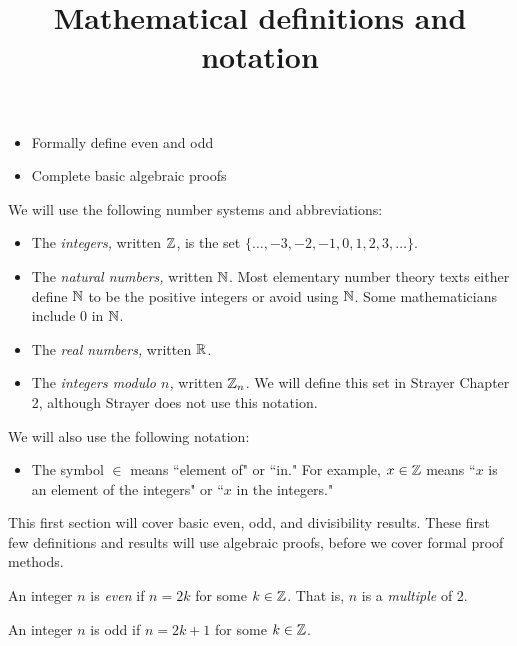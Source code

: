 \documentclass{ximera}
\title{Mathematical definitions and notation}
\begin{document}
\begin{abstract}
\end{abstract}
\maketitle


\begin{itemize}
  \item Formally define even and odd
  \item Complete basic algebraic proofs
\end{itemize}



\begin{definition}\label{defn:number-systems} 
  We will use the following number systems and abbreviations:
  \begin{itemize}
    \item The \emph{integers,} written $\mathbb Z$, is the set $\{\dots,-3,-2,-1,0,1,2,3,\dots\}$. 
    \item The \emph{natural numbers,} written $\mathbb N$. Most elementary number theory texts either define $\mathbb N$ to be the positive integers or avoid using $\mathbb N$. Some mathematicians include $0$ in $\mathbb N$.
    \item The \emph{real numbers,} written $\mathbb R$.
    \item The \emph{integers modulo $n$,} written $\mathbb Z_n$. We will define this set in Strayer Chapter 2, although Strayer does not use this notation.
  \end{itemize}
  We will also use the following notation:
  \begin{itemize}
    \item The symbol $\in$ means ``element of" or ``in." For example, $x\in\mathbb Z$ means ``$x$ is an element of the integers" or ``$x$ in the integers."
  \end{itemize}
\end{definition}

This first section will cover basic even, odd, and divisibility results. These first few definitions and results will use algebraic proofs, before we cover formal proof methods.

\begin{definition}\label{defn:even-odd-form}
  An integer $n$ is \emph{even} if $n=2k$ for some $k\in\mathbb Z$. That is, $n$ is a \emph{multiple} of $2.$

  An integer $n$ is odd if $n=2k+1$ for some $k\in\mathbb Z$.
\end{definition}
\end{document}
